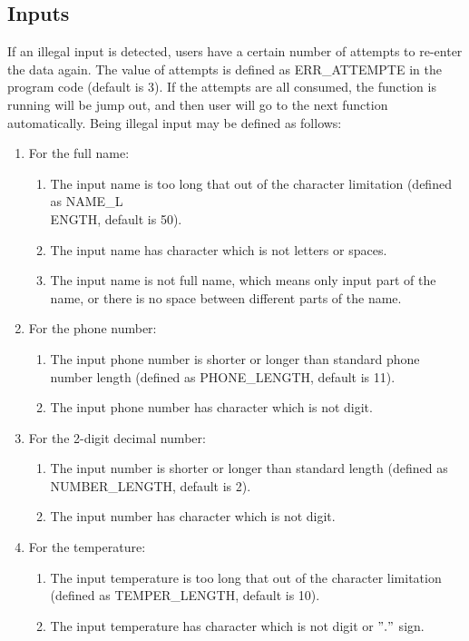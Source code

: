 \documentclass[12pt]{article}
\begin{document}
	\subsection{Inputs}
	If an illegal input is detected, users have a certain number of attempts to re-enter the data again. The value of attempts is defined as ERR\_ATTEMPTE in the program code (default is 3). If the attempts are all consumed, the function is running will be jump out, and then user will go to the next function automatically. Being illegal input may be defined as follows:
	
	\begin{enumerate}
	\item For the full name:
	
		\begin{enumerate}
		\item The input name is too long that out of the character limitation (defined as NAME\_L\\ENGTH, default is 50).
		\item The input name has character which is not letters or spaces.
		\item The input name is not full name, which means only input part of the name, or there is no space between different parts of the name.
		\end{enumerate}
	
	\item For the phone number:
	
		\begin{enumerate}
		\item The input phone number is shorter or longer than standard phone number length (defined as PHONE\_LENGTH, default is 11).
		\item The input phone number has character which is not digit.
		\end{enumerate}
	
	\item For the 2-digit decimal number:
	
		\begin{enumerate}
		\item The input number is shorter or longer than standard length (defined as NUMBER\_LENGTH, default is 2).
		\item The input number has character which is not digit.
		\end{enumerate}
	
	\item For the temperature:
	
		\begin{enumerate}
		\item The input temperature is too long that out of the character limitation (defined as TEMPER\_LENGTH, default is 10).
		\item The input temperature has character which is not digit or $"."$ sign.
		\end{enumerate}
	
	\end{enumerate}
\end{document}
